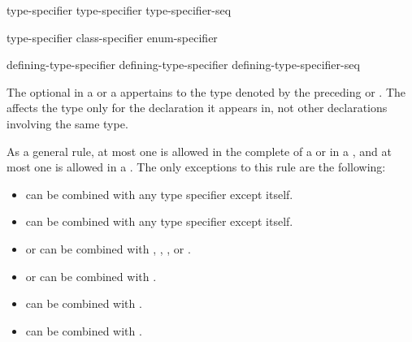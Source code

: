 \begin{bnf}
\br
    type-specifier \br
    type-specifier type-specifier-seq
\end{bnf}

\begin{bnf}
\br
    type-specifier\br
    class-specifier\br
    enum-specifier
\end{bnf}

\begin{bnf}
\br
  defining-type-specifier \br
  defining-type-specifier defining-type-specifier-seq
\end{bnf}

The optional  in a 
or a 
appertains
to the type denoted by the preceding 
or . The
 affects the type only for the declaration it appears in,
not other declarations involving the same type.

\pnum
As a general rule, at most one
is allowed in the complete
 of a  or in a
,
and at most one
is allowed in a
.
The only exceptions to this rule are the following:
\begin{itemize}
\item {} can be combined with any type specifier except itself.

\item {} can be combined with any type specifier except itself.

\item {} or  can be combined with
, , , or .

\item {} or  can be combined with .

\item {} can be combined with .

\item {} can be combined with .
\end{itemize}

